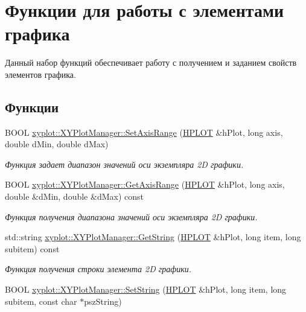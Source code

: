 \hypertarget{group__gr_elements}{\section{Функции для работы с элементами графика}
\label{group__gr_elements}
}


Данный набор функций обеспечивает работу с получением и заданием свойств элементов графика.  


\subsection*{Функции}
\begin{DoxyCompactItemize}
\item 
B\-O\-O\-L \hyperlink{group__gr_elements_gac086b543fc9cab773b6807c2420ce739}{xyplot\-::\-X\-Y\-Plot\-Manager\-::\-Set\-Axis\-Range} (\hyperlink{classxyplot_1_1_h_p_l_o_t}{H\-P\-L\-O\-T} \&h\-Plot, long axis, double d\-Min, double d\-Max)
\begin{DoxyCompactList}\small\item\em Функция задает диапазон значений оси экземпляра 2\-D графики. \end{DoxyCompactList}\item 
B\-O\-O\-L \hyperlink{group__gr_elements_ga086a2c52f7ad3bddbe9269228fd0977a}{xyplot\-::\-X\-Y\-Plot\-Manager\-::\-Get\-Axis\-Range} (\hyperlink{classxyplot_1_1_h_p_l_o_t}{H\-P\-L\-O\-T} \&h\-Plot, long axis, double \&d\-Min, double \&d\-Max) const 
\begin{DoxyCompactList}\small\item\em Функция получения диапазона значений оси экземпляра 2\-D графики. \end{DoxyCompactList}\item 
std\-::string \hyperlink{group__gr_elements_ga854706a96f0c8cfba9db24dc3f4bb54f}{xyplot\-::\-X\-Y\-Plot\-Manager\-::\-Get\-String} (\hyperlink{classxyplot_1_1_h_p_l_o_t}{H\-P\-L\-O\-T} \&h\-Plot, long item, long subitem) const 
\begin{DoxyCompactList}\small\item\em Функция получения строки элемента 2\-D графики. \end{DoxyCompactList}\item 
B\-O\-O\-L \hyperlink{group__gr_elements_ga765727fbc082d07df181ba5bacb230f3}{xyplot\-::\-X\-Y\-Plot\-Manager\-::\-Set\-String} (\hyperlink{classxyplot_1_1_h_p_l_o_t}{H\-P\-L\-O\-T} \&h\-Plot, long item, long subitem, const char $\ast$psz\-String)

\end{DoxyCompactItemize}
